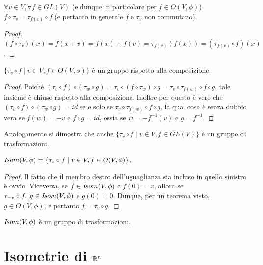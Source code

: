  \begin{lemma}
 $\forall v\in V, \forall f\in GL(V)$ (e dunque in particolare per 
 $f\in O(V,\phi)$) $f\circ\tau_v=\tau_{f(v)}\circ f$ (e pertanto in generale $f$ e $\tau_v$ non commutano).
 \end{lemma}
 
 \begin{proof}
 $(f\circ\tau_v)(x)=f(x+v)=f(x)+f(v)=\tau_{f(v)}(f(x))=(\tau_{f(v)}\circ f)(x)$.
  \end{proof}
 
 \begin{proposition}
 $\{\tau_v\circ f\;|\;v\in V,f\in O(V,\phi)\}$ è un gruppo rispetto alla composizione.
 \end{proposition}
 
 \begin{proof}
 Poiché  $(\tau_v\circ f)\circ(\tau_w\circ g)=\tau_v\circ(f\circ\tau_w)\circ g=
 \tau_v\circ\tau_{f(w)}\circ f\circ g$, tale insieme è chiuso rispetto alla composizione.
 Inoltre per questo è vero che $(\tau_v\circ f)\circ(\tau_w\circ g)=id$ se e solo se $\tau_v\circ\tau_{f(w)}\circ f\circ g$,
 la qual cosa è senza dubbio vera se $f(w)=-v$  e  $f\circ g=id$, ossia se $w=-f^{-1}(v)$  e 
 $g=f^{-1}$.
  \end{proof}
 
 \begin{remark}
 Analogamente si dimostra che anche $\{\tau_v\circ f\;|\;v\in V,f\in GL(V)\}$ 
 è un gruppo di trasformazioni.
 \end{remark}
 
 \begin{theorem}
 \label{thm:isometrie}
 $I\!som( V,\phi)=\{\tau_v\circ f\;|\;v\in V,f\in O(V,\phi)\}$.
 \end{theorem}
 
 \begin{proof}
 Il fatto che il membro destro dell'uguaglianza sia incluso in quello sinistro è ovvio.
 Viceversa, se $f\in I\!som( V,\phi)$  e  $f(0)=v$, allora se  $\tau_{-v}\circ f,\; g\in I\!som( V,\phi)$ e
 $g(0)=0$. Dunque, per un teorema visto, $g\in O(V,\phi)$, e pertanto $f=\tau_v\circ g$.
  \end{proof}
 
 \begin{corollary}
$I\!som( V,\phi)$ è un gruppo di trasformazioni.
 \end{corollary}
 
 
\section{Isometrie di $\mathbb R^n$}
 
